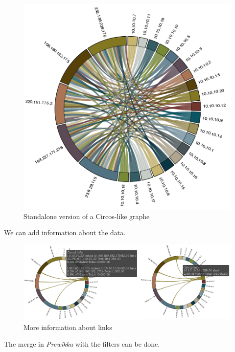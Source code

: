 \documentclass{koala-en}
\begin{document}
\begin{figure}[!ht]
  \center
  \includegraphics[width=15cm]{circos.png}
  \caption{Standalone version of a Circos-like graphe}
\end{figure}


We can add information about the data.

\begin{figure}[!ht]
  \center
  \includegraphics[width=15cm]{circostt.png}
  \caption{More information about links}
\end{figure}

\thispagestyle{fancy}
\newpage

The merge in \emph{Prewikka} with the filters can be done.
\end{document}
